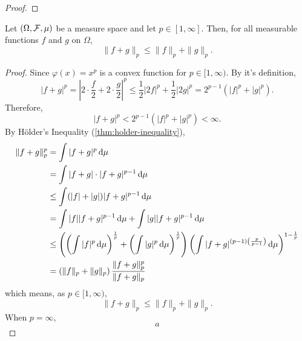 \begin{proof}

\end{proof}

\begin{theorem}\label{thm:minkowski-inequality}
	Let \((\Omega,\mathcal{F},\mu)\) be a measure space and let \(p\in[1,\infty]\). Then, for all measurable functions \(f\) and \(g\) on \(\Omega\),
	\begin{equation}
		\|f+g\|_{p} \leq\|f\|_{p}+\|g\|_{p}.
	\end{equation}
\end{theorem}

\begin{proof}
	Since \(\varphi(x)=x^p\) is a convex function for \(p\in[1,\infty)\). By it's definition,
	\begin{equation*}
		|f+g|^{p}=\left|2\cdot\frac{f}{2}+2\cdot\frac{g}{2}\right|^{p}\leq \frac{1}{2}|2f|^p+\frac{1}{2}|2g|^p=2^{p-1}\left(|f|^{p}+|g|^{p}\right).
	\end{equation*}
	Therefore,
	\begin{equation*}
		|f+g|^{p}<2^{p-1}\left(|f|^{p}+|g|^{p}\right)<\infty.
	\end{equation*}
	By H\"older's Inequality (\ref{thm:holder-inequality}),
	\begin{equation*}
		\begin{aligned}
			\|f+g\|_{p}^{p} & =\int|f+g|^{p}\dif\mu                                                                                                                                                                             \\
			                & =\int|f+g| \cdot|f+g|^{p-1}\dif \mu                                                                                                                                                               \\
			                & \leq \int(|f|+|g|)|f+g|^{p-1}\dif\mu                                                                                                                                                              \\
			                & =\int|f||f+g|^{p-1}\dif\mu+\int|g||f+g|^{p-1}\dif\mu                                                                                                                                              \\
			                & \leq\left(\left(\int|f|^{p} \dif \mu\right)^{\frac{1}{p}}+\left(\int|g|^{p} \dif \mu\right)^{\frac{1}{p}}\right)\left(\int|f+g|^{(p-1)\left(\frac{p}{p-1}\right)} \dif \mu\right)^{1-\frac{1}{p}} \\
			                & =\left(\|f\|_{p}+\|g\|_{p}\right) \frac{\|f+g\|_{p}^{p}}{\|f+g\|_{p}}
		\end{aligned}
	\end{equation*}
	which means, as \(p\in[1,\infty)\),
	\begin{equation*}
		\|f+g\|_{p} \leq\|f\|_{p}+\|g\|_{p}.
	\end{equation*}
	When \(p=\infty\),
	\begin{equation*}
		a
	\end{equation*}
\end{proof}

